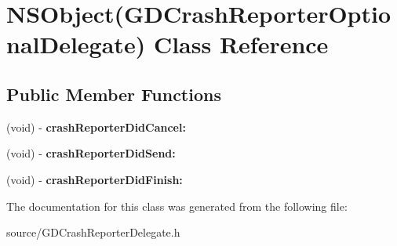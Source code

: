 \hypertarget{interface_n_s_object_07_g_d_crash_reporter_optional_delegate_08}{
\section{NSObject(GDCrashReporterOptionalDelegate) Class Reference}
\label{interface_n_s_object_07_g_d_crash_reporter_optional_delegate_08}
}
\subsection*{Public Member Functions}
\begin{DoxyCompactItemize}
\item 
\hypertarget{interface_n_s_object_07_g_d_crash_reporter_optional_delegate_08_ae67a43997cf930ca3deb3140f030d5cb}{
(void) -\/ {\bfseries crashReporterDidCancel:}}
\label{interface_n_s_object_07_g_d_crash_reporter_optional_delegate_08_ae67a43997cf930ca3deb3140f030d5cb}

\item 
\hypertarget{interface_n_s_object_07_g_d_crash_reporter_optional_delegate_08_a0da410763e1f9d983d13ca2612d7c518}{
(void) -\/ {\bfseries crashReporterDidSend:}}
\label{interface_n_s_object_07_g_d_crash_reporter_optional_delegate_08_a0da410763e1f9d983d13ca2612d7c518}

\item 
\hypertarget{interface_n_s_object_07_g_d_crash_reporter_optional_delegate_08_acf0dfb3ea807e42b1cdb16a1f24a6fed}{
(void) -\/ {\bfseries crashReporterDidFinish:}}
\label{interface_n_s_object_07_g_d_crash_reporter_optional_delegate_08_acf0dfb3ea807e42b1cdb16a1f24a6fed}

\end{DoxyCompactItemize}


The documentation for this class was generated from the following file:\begin{DoxyCompactItemize}
\item 
source/GDCrashReporterDelegate.h\end{DoxyCompactItemize}
